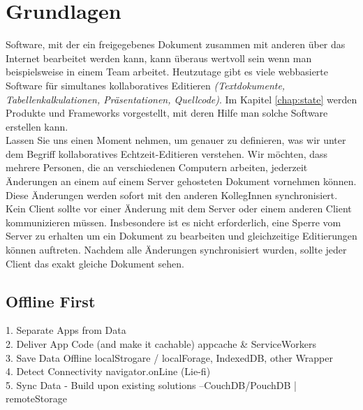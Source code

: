\chapter{\label{chap:grundlagen}Grundlagen}
Software, mit der ein freigegebenes Dokument zusammen mit anderen über das Internet bearbeitet werden kann, kann überaus wertvoll sein wenn man beispielsweise in einem Team arbeitet. Heutzutage gibt es viele webbasierte Software für simultanes kollaboratives Editieren \textit{(Textdokumente, Tabellenkalkulationen, Präsentationen, Quellcode)}. Im Kapitel \ref{chap:state} werden Produkte und Frameworks vorgestellt, mit deren Hilfe man solche Software erstellen kann.\\
Lassen Sie uns einen Moment nehmen, um genauer zu definieren, was wir unter dem Begriff kollaboratives Echtzeit-Editieren verstehen.
Wir möchten, dass mehrere Personen, die an verschiedenen Computern arbeiten, jederzeit Änderungen an einem auf einem Server gehosteten Dokument vornehmen können. Diese Änderungen werden sofort mit den anderen KollegInnen synchronisiert. Kein Client sollte vor einer Änderung mit dem Server oder einem anderen Client kommunizieren müssen. Insbesondere ist es nicht erforderlich, eine Sperre vom Server zu erhalten um ein Dokument zu bearbeiten und gleichzeitige Editierungen können auftreten. Nachdem alle Änderungen synchronisiert wurden, sollte jeder Client das exakt gleiche Dokument sehen.

%
%
\section{Offline First}
1. Separate Apps from Data\\
2. Deliver App Code (and make it cachable) {appcache \& ServiceWorkers}\\
3. Save Data Offline {localStrogare / localForage, IndexedDB, other Wrapper}\\
4. Detect Connectivity {navigator.onLine} (Lie-fi)\\
5. Sync Data - Build upon existing solutions --CouchDB/PouchDB | remoteStorage\\

%
%
